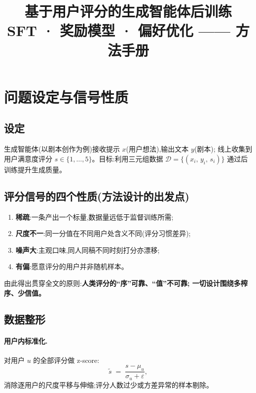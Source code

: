 \documentclass[UTF8, 11pt]{ctexart}
\title{基于用户评分的生成智能体后训练\\[4pt]
       \large SFT · 奖励模型 · 偏好优化 —— 方法手册}
\author{}
\date{}
\begin{document}
\maketitle
\vspace{-2em}
\tableofcontents
\newpage

\section{问题设定与信号性质}

\subsection{设定}

生成智能体(以剧本创作为例)接收提示 $x$(用户想法),输出文本 $y$(剧本);
线上收集到用户满意度评分 $s\in\{1,\dots,5\}$。目标:利用三元组数据
$\mathcal{D}=\{(x_i,\,y_i,\,s_i)\}$ 通过后训练提升生成质量。

\subsection{评分信号的四个性质(方法设计的出发点)}

\begin{enumerate}
  \item \textbf{稀疏}:一条产出一个标量,数据量远低于监督训练所需;
  \item \textbf{尺度不一}:同一分值在不同用户处含义不同(评分习惯差异);
  \item \textbf{噪声大}:主观口味,同人同稿不同时刻打分亦漂移;
  \item \textbf{有偏}:愿意评分的用户并非随机样本。
\end{enumerate}

由此得出贯穿全文的原则:\textbf{人类评分的``序''可靠、``值''不可靠;
一切设计围绕多榨序、少信值。}

\subsection{数据整形}

\paragraph{用户内标准化.} 对用户 $u$ 的全部评分做 z-score:
\begin{equation}
\tilde s \;=\; \frac{s-\mu_u}{\sigma_u+\varepsilon},
\label{eq:zscore}
\end{equation}
消除逐用户的尺度平移与伸缩;评分人数过少或方差异常的样本剔除。
\end{document}
